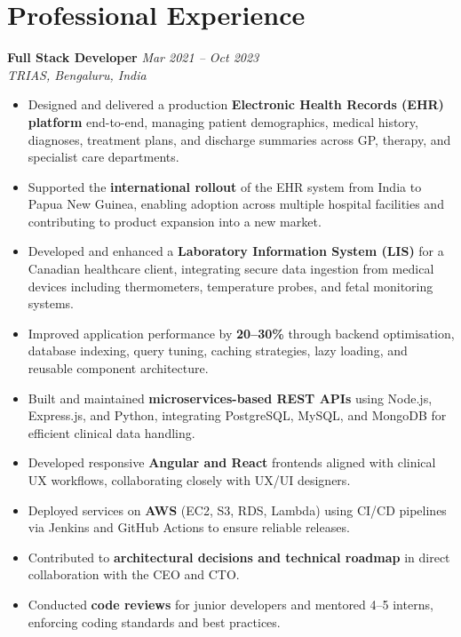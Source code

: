 \documentclass[11pt, a4paper]{article}
\begin{document}
\section{Professional Experience}

\noindent
{\small\textbf{Full Stack Developer} \hfill \textit{Mar 2021 -- Oct 2023}}\\[-2pt]
{\small\textit{TRIAS, Bengaluru, India}}

\begin{itemize}\small
  \item Designed and delivered a production \textbf{Electronic Health Records (EHR) platform} end-to-end, managing patient demographics, medical history, diagnoses, treatment plans, and discharge summaries across GP, therapy, and specialist care departments.
  \item Supported the \textbf{international rollout} of the EHR system from India to Papua New Guinea, enabling adoption across multiple hospital facilities and contributing to product expansion into a new market.
  \item Developed and enhanced a \textbf{Laboratory Information System (LIS)} for a Canadian healthcare client, integrating secure data ingestion from medical devices including thermometers, temperature probes, and fetal monitoring systems.
  \item Improved application performance by \textbf{20--30\%} through backend optimisation, database indexing, query tuning, caching strategies, lazy loading, and reusable component architecture.
  \item Built and maintained \textbf{microservices-based REST APIs} using Node.js, Express.js, and Python, integrating PostgreSQL, MySQL, and MongoDB for efficient clinical data handling.
  \item Developed responsive \textbf{Angular and React} frontends aligned with clinical UX workflows, collaborating closely with UX/UI designers.
  \item Deployed services on \textbf{AWS} (EC2, S3, RDS, Lambda) using CI/CD pipelines via Jenkins and GitHub Actions to ensure reliable releases.
  \item Contributed to \textbf{architectural decisions and technical roadmap} in direct collaboration with the CEO and CTO.
  \item Conducted \textbf{code reviews} for junior developers and mentored 4--5 interns, enforcing coding standards and best practices.
\end{itemize}
\end{document}
